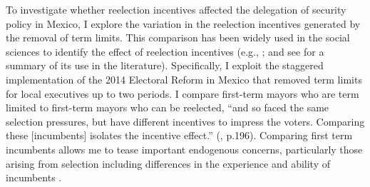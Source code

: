 \documentclass[12pt]{amsart}
\numberwithin{equation}{section}
\theoremstyle{definition}
\theoremstyle{definition}
\theoremstyle{definition}
\begin{document}
To investigate whether reelection incentives affected the delegation of security policy in Mexico, I explore the variation in the reelection incentives generated by the removal of term limits. This comparison has been widely used in the social sciences to identify the effect of reelection incentives (e.g., \citet{Besley_case_1995}; and see \citet{ashworth_2012} for a summary of its use in the literature). Specifically, I exploit the staggered implementation of the 2014 Electoral Reform in Mexico that removed term limits for local executives up to two periods. I compare first-term mayors who are term limited to first-term mayors who can be reelected, ``and so faced the same selection pressures, but have different incentives to impress the voters. Comparing these [incumbents] isolates the incentive effect.'' (\citet{ashworth_2012}, p.196). Comparing first term incumbents allows me to tease important endogenous concerns, particularly those arising from selection including differences in the experience and ability of incumbents \citep{ferraz_finan_2011}. 
   
\end{document}
